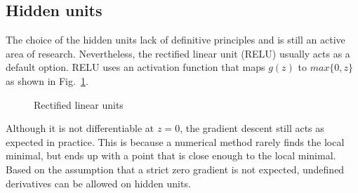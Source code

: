 \subsection{Hidden units}
The choice of the hidden units lack of definitive principles and is still an active area of research.
Nevertheless, the rectified linear unit (RELU) usually acts as a default option.
RELU uses an activation function that maps $g(z)$ to $max\{0,z\}$ as shown in Fig.~\ref{lr_fig:ml_relu}.
\begin{figure}[!ht]
    \centering
    \caption[Rectified linear units(RELU)]{Rectified linear units}
    \label{lr_fig:ml_relu}
\end{figure}
%
Although it is not differentiable at $z=0$, the gradient descent still acts as expected in practice.
This is because a numerical method rarely finds the local minimal, but ends up with a point that is close enough to the local minimal.
Based on the assumption that a strict zero gradient is not expected, undefined derivatives can be allowed on hidden units.

